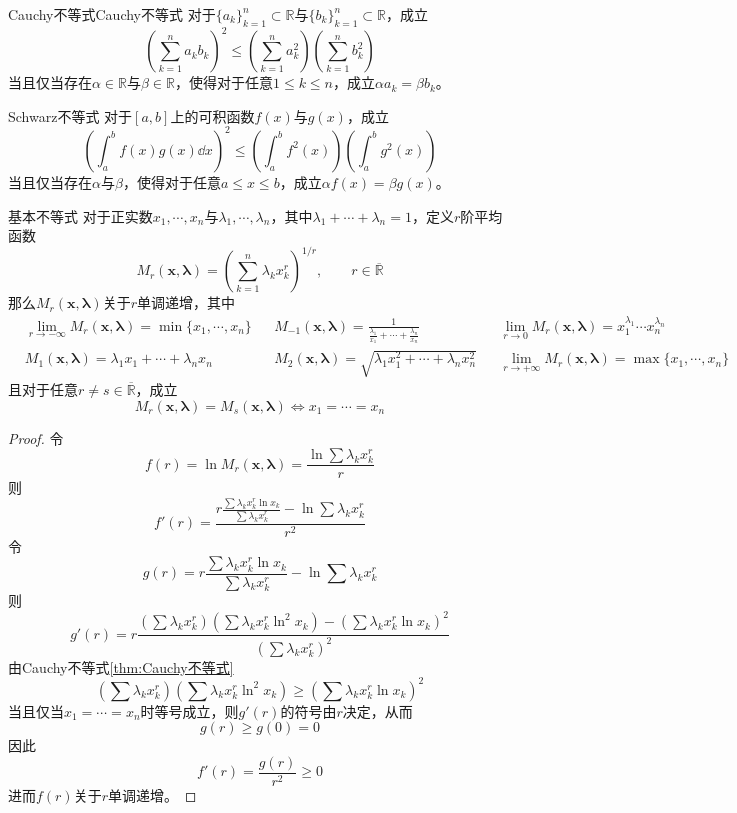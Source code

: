 \documentclass[lang = cn, scheme = chinese, thmcnt = section]{elegantbook}
\newcommand{\R}{\mathbb{R}}            %
\newcommand{\sub}{\subset}             %
\newcommand{\bs}{\boldsymbol}          %
\begin{document}
\begin{theorem}{Cauchy不等式}{Cauchy不等式}
	对于$\{ a_k \}_{k=1}^{n}\sub\R$与$\{ b_k \}_{k=1}^{n}\sub\R$，成立
	$$
	\left(\sum_{k=1}^{n}a_kb_k\right)^2
	\le \left(\sum_{k=1}^{n}a_k^2\right)\left(\sum_{k=1}^{n}b_k^2\right)
	$$
	当且仅当存在$\alpha\in\R$与$\beta\in\R$，使得对于任意$1\le k \le n$，成立$\alpha a_k =\beta b_k$。
\end{theorem}

\begin{theorem}{Schwarz不等式}
	对于$[a,b]$上的可积函数$f(x)$与$g(x)$，成立
	$$
	\left(\int_a^b f(x)g(x)\dd x\right)^2
	\le \left(\int_{a}^{b}f^2(x)\right) \left(\int_{a}^{b}g^2(x)\right)
	$$
	当且仅当存在$\alpha$与$\beta$，使得对于任意$a\le x\le b$，成立$\alpha f(x) =\beta g(x)$。
\end{theorem}

\begin{theorem}{基本不等式}
	对于正实数$x_1,\cdots,x_n$与$\lambda_1,\cdots,\lambda_n$，其中$\lambda_1+\cdots+\lambda_n=1$，定义$r$阶平均函数%
	$$
	M_r(\bs{x},\bs{\lambda})=\left(\sum_{k=1}^{n}\lambda_k x_k^r\right)^{1/r},\qquad r\in\overline{\R}
	$$
	那么$M_r(\bs{x},\bs{\lambda})$关于$r$单调递增，其中
	\small{
	\begin{align*}
		&
		\lim_{r\to -\infty}M_{r}(\bs{x},\bs{\lambda})=\min\{ x_1,\cdots,x_n \} && M_{-1}(\bs{x},\bs{\lambda})=\frac{1}{\frac{\lambda_1}{x_1}+\cdots+\frac{\lambda_n}{x_n}} &&
		\lim_{r\to 0}M_{r}(\bs{x},\bs{\lambda})=x_1^{\lambda_1}\cdots x_n^{\lambda_n}\\
		& M_{1}(\bs{x},\bs{\lambda})=\lambda_1x_1+\cdots+\lambda_nx_n &&
		M_{2}(\bs{x},\bs{\lambda})=\sqrt{\lambda_1x_1^2+\cdots+\lambda_nx_n^2}&&
		\lim_{r\to +\infty}M_{r}(\bs{x},\bs{\lambda})=\max\{ x_1,\cdots,x_n \} 
	\end{align*}}
	且对于任意$r\ne s\in\overline{\R}$，成立%
	$$
	M_{r}(\bs{x},\bs{\lambda})=M_{s}(\bs{x},\bs{\lambda})
	\iff
	x_1=\cdots=x_n
	$$
\end{theorem}

\begin{proof}
	令
	$$
	f(r)
	=\ln M_{r}(\bs{x},\bs{\lambda})
	=\frac{\ln \sum\lambda_k x_k^r}{r}
	$$
	则
	$$
	f'(r)
	=\frac{ r\frac{ \sum\lambda_k x_k^r\ln x_k}{ \sum\lambda_k x_k^r}-\ln\sum\lambda_k x_k^r}{r^2}
	$$
	令
	$$
	g(r)=r\frac{ \sum\lambda_k x_k^r\ln x_k}{ \sum\lambda_k x_k^r}-\ln\sum\lambda_k x_k^r
	$$
	则
	$$
	g'(r)=r\frac{\left( \sum\lambda_k x_k^r \right)\left( \sum\lambda_k x_k^r\ln^2x_k \right)-\left( \sum\lambda_k x_k^r\ln x_k \right)^2}{\left( \sum\lambda_k x_k^r \right)^2}
	$$
	由Cauchy不等式\ref{thm:Cauchy不等式}
	$$
	\left( \sum\lambda_k x_k^r \right)\left( \sum\lambda_k x_k^r\ln^2x_k \right)
	\ge\left( \sum\lambda_k x_k^r\ln x_k \right)^2
	$$
	当且仅当$x_1=\cdots=x_n$时等号成立，则$g'(r)$的符号由$r$决定，从而
	$$
	g(r)\ge g(0)=0
	$$
	因此
	$$
	f'(r)=\frac{g(r)}{r^2}\ge 0
	$$
	进而$f(r)$关于$r$单调递增。
\end{proof}
\end{document}

